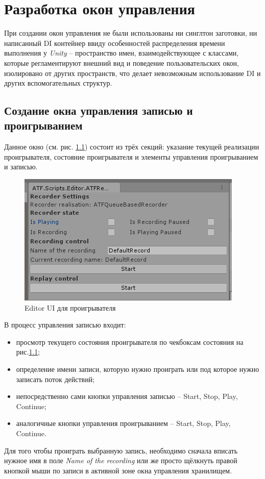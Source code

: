 \chapter{Разработка окон управления}
\label{cha:ch_3}
При создании окон управления не были использованы ни синглтон заготовки, ни написанный DI контейнер ввиду особенностей распределения времени выполнения  у \textit{Unity} -- пространство имен, взаимодействующее с классами, которые регламентируют внешний вид и поведение пользовательских окон, изолировано от других пространств, что делает невозможным использование DI и других вспомогательных структур. 

\section{Создание окна управления записью и проигрыванием}
Данное окно (см. рис. \ref{recorderUI}) состоит из трёх секций: указание текущей реализации проигрывателя, состояние проигрывателя и элементы управления проигрыванием и записью.

\begin{figure}[h]
	\centering
	\includegraphics[width=0.7\linewidth]{recorder.PNG}
	\caption{Editor UI для проигрывателя}
	\label{recorderUI}
\end{figure}

В процесс управления записью входит:
\begin{itemize}
	\item
	просмотр текущего состояния проигрывателя по чекбоксам состояния на рис.\ref{recorderUI};
	\item
	определение имени записи, которую нужно проиграть или под которое нужно записать поток действий;
	\item
	непосредственно сами кнопки управления записью -- Start, Stop, Play, Continue;
	\item
	аналогичные кнопки управления проигрыванием -- Start, Stop, Play, Continue.
\end{itemize}
Для того чтобы проиграть выбранную запись, необходимо сначала вписать нужное имя в поле \textit{Name of the recording} или же просто щёлкнуть правой кнопкой мыши по записи в активной зоне окна управления хранилищем.

